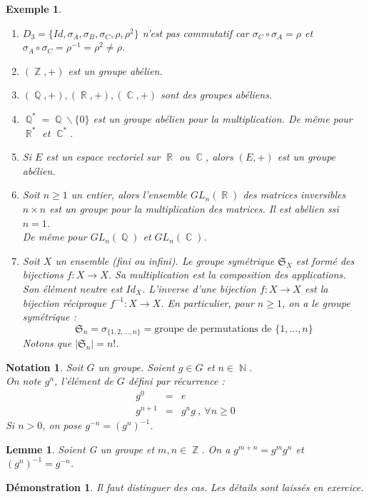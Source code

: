 \documentclass[a4paper, oneside]{report}
\theoremstyle{break}
\newtheorem{lemme}[thm]{Lemme}
\newtheorem{nota}[thm]{Notation}
\newtheorem{exem}[thm]{Exemple}
\newtheorem*{demo}{Démonstration}
\newcommand{\ev}{espace vectoriel }
\newcommand{\x}{\times}
\DeclareMathOperator{\R}{\mathbb{R}}
\DeclareMathOperator{\N}{\mathbb{N}}
\DeclareMathOperator{\C}{\mathbb{C}}
\DeclareMathOperator{\Z}{\mathbb{Z}}
\DeclareMathOperator{\Q}{\mathbb{Q}}
\renewcommand{\S}{\mathfrak{S}}
\begin{document}
\begin{exem}
	\begin{enumerate}
		\item $D_3=\{Id, \sigma_A, \sigma_B, \sigma_C, \rho, \rho^2\}$ n'est pas commutatif car $\sigma_C \circ \sigma_A = \rho$ et $\sigma_A \circ \sigma_C = \rho^{-1} = \rho ^2 \neq \rho$.
		\item $(\Z, +)$ est un groupe abélien.
		\item $(\Q,+), (\R,+), (\C,+)$ sont des groupes abéliens.
		\item $\Q^*=\Q \backslash \{0\}$ est un groupe abélien pour la multiplication. De même pour $\R^*$ et $\C^*$.
		\item Si $E$ est un \ev sur $\R$ ou $\C$, alors $(E,+)$ est un groupe abélien.
		\item Soit $n\geq 1$ un entier, alors l'ensemble $GL_n(\R)$ des matrices inversibles $n\x n$ est un groupe pour la multiplication des matrices. Il est abélien ssi $n=1$.\\
		De même pour $GL_n(\Q)$ et $GL_n(\C)$.\\
		\item Soit $X$ un ensemble (fini ou infini). Le groupe symétrique $\S_X$ est formé des bijections $f:X\rightarrow X$. Sa multiplication est la composition des applications. Son élément neutre est $Id_X$. L'inverse d'une bijection $f:X\rightarrow X$ est la bijection réciproque $f^{-1}:X\rightarrow X$. En particulier, pour $n\geq 1$, on a le groupe symétrique :
		$$\S_n = \sigma_{\{1,2,...,n\}} = \text{groupe de permutations de } \{1,...,n\}$$
		Notons que $|\S_n|=n!$.
	\end{enumerate}	
\end{exem}

\begin{nota}
	Soit $G$ un groupe. Soient $g\in G$ et $n\in \N$.\\
	On note $g^n$, l'élément de $G$ défini par récurrence :
	$$\begin{array}{lll}
	g^0&=&e\\
	g^{n+1}&=&g^ng~,~\forall n \geq 0
	\end{array}$$
	Si $n>0$, on pose $g^{-n}=(g^n)^{-1}$.	
\end{nota}

\begin{lemme}
	Soient G un groupe et $m,n\in\Z$. On a $g^{m+n}=g^mg^n$ et $(g^n)^{-1}=g^{-n}$.
\end{lemme}
	

\begin{demo}
	Il faut distinguer des cas. Les détails sont laissés en exercice.	
\end{demo}
\end{document}
